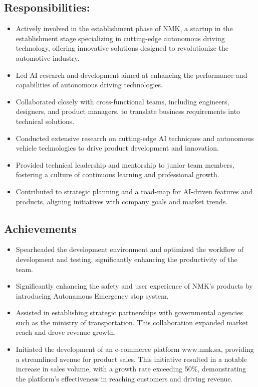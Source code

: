 \documentclass[letterpaper,
		10pt]{article}
\begin{document}
\subsection{Responsibilities:}
\begin{itemize}
\item Actively involved in the establishment phase of NMK, a startup in the establishment stage specializing in cutting-edge autonomous driving technology, offering innovative solutions designed to revolutionize the automotive industry. 
\item Led AI research and development aimed at enhancing the performance and capabilities of autonomous driving technologies.
\item Collaborated closely with cross-functional teams, including engineers, designers, and product managers, to translate business requirements into technical solutions.
\item Conducted extensive research on cutting-edge AI techniques and autonomous vehicle technologies to drive product development and innovation.
\item Provided technical leadership and mentorship to junior team members, fostering a culture of continuous learning and professional growth.
\item Contributed to strategic planning and a road-map for AI-driven features and products, aligning initiatives with company goals and market trends.     
\end{itemize}

\subsection{Achievements}
\begin{itemize}
\item Spearheaded the development environment and optimized the workflow of development and testing, significantly enhancing the productivity of the team.
\item Significantly enhancing the safety and user experience of NMK's products by introducing Autonamous Emergency stop system. 
\item Assisted in establishing strategic partnerships with governmental agencies such as the ministry of transportation. This collaboration expanded market reach and drove revenue growth.
\item Initiated the development of an e-commerce platform www.nmk.sa, providing a streamlined avenue for product sales. This initiative resulted in a notable increase in sales volume, with a growth rate exceeding 50\%, demonstrating the platform's effectiveness in reaching customers and driving revenue.
\end{itemize}
\end{document}
